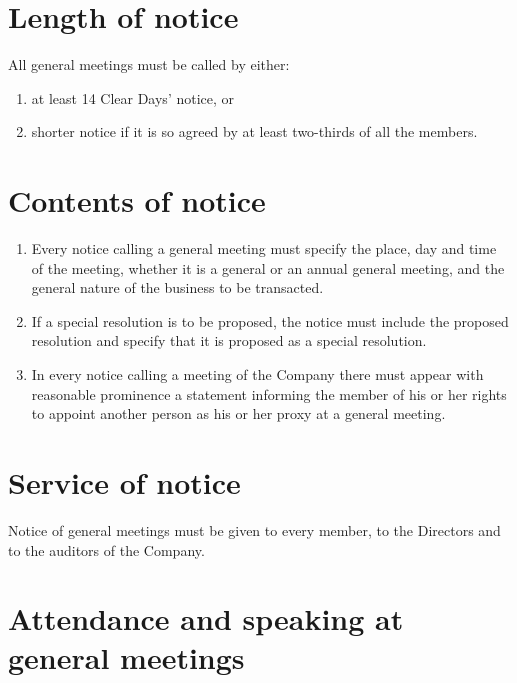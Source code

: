 \documentclass[a4paper,12pt]{article}
\begin{document}
\section{Length of notice}

All general meetings must be called by either:

\begin{enumerate}
  \item at least 14 Clear Days' notice, or
  \item shorter notice if it is so agreed by at least two-thirds of all the members. %
\end{enumerate}

\section{Contents of notice}

\begin{enumerate}
  \item Every notice calling a general meeting must specify the place, day and time of the meeting, whether it is a general or an annual general meeting, and the general nature of the business to be transacted.
  \item If a special resolution is to be proposed, the notice must include the proposed resolution and specify that it is proposed as a special resolution.
  \item In every notice calling a meeting of the Company there must appear with reasonable prominence a statement informing the member of his or her rights to appoint another person as his or her proxy at a general meeting.
\end{enumerate}

\section{Service of notice}

Notice of general meetings must be given to every member, to the Directors and to the auditors of the Company.

\section{Attendance and speaking at general meetings}
\end{document}
